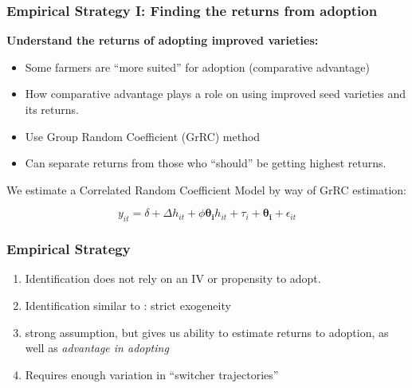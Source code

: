 \documentclass{beamer}
\begin{document}
\begin{frame}
\frametitle{Empirical Strategy I: Finding the returns from adoption}

\textbf{Understand the returns of adopting improved varieties: }
\begin{itemize}
    \item Some farmers are ``more suited'' for adoption (comparative advantage) \citep{Suri2011-oi}
    \item How comparative advantage plays a role on using improved seed varieties and its returns.
    \item Use Group Random Coefficient (GrRC) method \citep{Tjernstrom_Emilia_Dalia_Ghanem_Oscar_Barriga_Cabanillas_Travis_J_Lybbert_Jeffrey_D_Michler_and_Aleksandr_Michuda2020-bc}
    \item Can separate returns from those who ``should'' be getting highest returns.
\end{itemize}  


We estimate a Correlated Random Coefficient Model by way of GrRC estimation:
\vspace{-2em}
\begin{center}
$$
    y_{it}= \delta + \Delta h_{it} + \phi\boldsymbol{\theta_i} h_{it} + \tau_{i} + \boldsymbol{\theta_i} + \epsilon_{it}
$$  
\end{center}

\end{frame}


\begin{frame}
\frametitle{Empirical Strategy}
\begin{enumerate}
    \item Identification does not rely on an IV or propensity to adopt.
    \item Identification similar to \cite{Chamberlain1984-uk}: strict exogeneity
    \item strong assumption, but gives us ability to estimate returns to adoption, as well as \textit{advantage in adopting}
    \item Requires enough variation in ``switcher trajectories'' 
\end{enumerate}


\end{frame}
\end{document}
